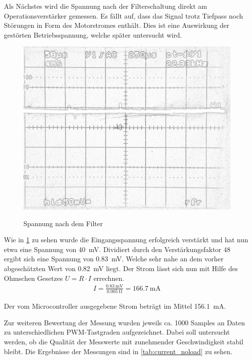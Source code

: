 Als Nächstes wird die Spannung nach der Filterschaltung direkt am Operationsverstärker gemessen. Es fällt auf, dass das Signal trotz Tiefpass noch Störungen in Form des Motorstromes enthält.
Dies ist eine Auswirkung der gestörten Betriebsspannung, welche später untersucht wird.


\begin{figure}[H]
\centering
\includegraphics[width=.8\textwidth]{filter_ausgang.png}\\
\caption{Spannung nach dem Filter}%
\label{fig:filter_ausgang}
\end{figure}


Wie in \cref{fig:filter_ausgang} zu sehen wurde die Eingangsspannung erfolgreich verstärkt und hat nun etwa eine Spannung von \SI{40}{\mV}. Dividiert durch den Verstärkungsfaktor 48 ergibt sich eine Spannung von 
\SI{0,83}{\mV}. Welche sehr nahe an dem vorher abgeschätzten Wert von \SI{0,82}{\mV} liegt. Der Strom lässt sich nun mit Hilfe des Ohmschen Gesetzes $U=R\cdot I$ errechnen.
\begin{align*}
I=\frac{\SI{0,83}{\mV}}{\SI{0,005}{\ohm}}=\SI{166,7}{\mA}
\end{align*}

Der vom Microcontroller ausgegebene Strom beträgt im Mittel \SI{156,1}{\mA}.

Zur weiteren Bewertung der Messung wurden jeweils ca. 1000 Samples an Daten zu unterschiedlichen PWM-Tastgraden aufgezeichnet.
Dabei soll untersucht werden, ob die Qualität der Messwerte mit zunehmender Geschwindigkeit stabil bleibt.
Die Ergebnisse der Messungen sind in \cref{tab:current_noload} zu sehen.

